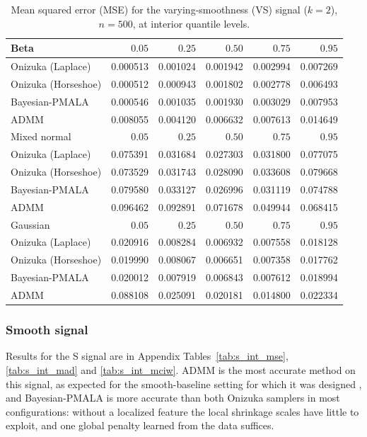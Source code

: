 \begin{table}[!htbp]
\centering
\small
\caption{Mean squared error (MSE) for the varying-smoothness (VS) signal ($k=2$), $n=500$, at interior quantile levels.}
\label{tab:vs_int_mse}
\begin{tabular}{lrrrrr}
\toprule
Beta & $0.05$ & $0.25$ & $0.50$ & $0.75$ & $0.95$ \\
\midrule
Onizuka (Laplace) & 0.000513 & 0.001024 & 0.001942 & 0.002994 & 0.007269 \\
Onizuka (Horseshoe) & 0.000512 & 0.000943 & 0.001802 & 0.002778 & 0.006493 \\
Bayesian-PMALA & 0.000546 & 0.001035 & 0.001930 & 0.003029 & 0.007953 \\
ADMM & 0.008055 & 0.004120 & 0.006632 & 0.007613 & 0.014649 \\
\midrule
Mixed normal & $0.05$ & $0.25$ & $0.50$ & $0.75$ & $0.95$ \\
\midrule
Onizuka (Laplace) & 0.075391 & 0.031684 & 0.027303 & 0.031800 & 0.077075 \\
Onizuka (Horseshoe) & 0.073529 & 0.031743 & 0.028090 & 0.033608 & 0.079668 \\
Bayesian-PMALA & 0.079580 & 0.033127 & 0.026996 & 0.031119 & 0.074788 \\
ADMM & 0.096462 & 0.092891 & 0.071678 & 0.049944 & 0.068415 \\
\midrule
Gaussian & $0.05$ & $0.25$ & $0.50$ & $0.75$ & $0.95$ \\
\midrule
Onizuka (Laplace) & 0.020916 & 0.008284 & 0.006932 & 0.007558 & 0.018128 \\
Onizuka (Horseshoe) & 0.019990 & 0.008067 & 0.006651 & 0.007358 & 0.017762 \\
Bayesian-PMALA & 0.020012 & 0.007919 & 0.006843 & 0.007612 & 0.018994 \\
ADMM & 0.088108 & 0.025091 & 0.020181 & 0.014800 & 0.022334 \\
\bottomrule
\end{tabular}
\end{table}

\clearpage
\subsubsection{Smooth signal}
\label{sec:sim:ind:smooth}

Results for the S signal are in Appendix Tables~\ref{tab:s_int_mse}, \ref{tab:s_int_mad} and \ref{tab:s_int_mciw}. ADMM is the most accurate method on this signal, as expected for the smooth-baseline setting for which it was designed \citep{brantley2020baseline}, and Bayesian-PMALA is more accurate than both Onizuka samplers in most configurations: without a localized feature the local shrinkage scales have little to exploit, and one global penalty learned from the data suffices.

